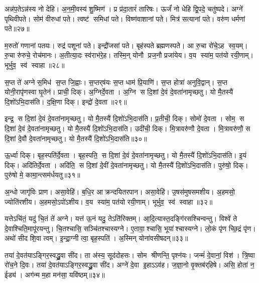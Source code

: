    अन्न॑प॒तेऽन्न॑स्य नो देहि।
   अ॒न॒मी॒वस्य॑ शु॒ष्मिण॑।
   प्र प्र॑दा॒तारं॑ तारिषः।
   ऊर्जं॑ नो धेहि द्वि॒पदे॒ चतु॑ष्पदे।
   अग्ने॑ पृथिवीपते।
   सोम॑ वीरुधां पते।
   त्वष्ट॑ समिधां पते।
   विष्ण॑वाशानां पते।
   मित्र॑ सत्यानां पते।
   वरु॑ण धर्मणां पते॥२७॥

   म॒रुतो॑  गणानां पतयः।
   रुद्र॑ पशूनां पते।
   इन्द्रौ॑जसां पते।
   बृह॑स्पते ब्रह्मणस्पते।
   आ रु॒चा रो॑चे॒ऽह स्व॒यम्।
   रु॒चा रु॑रुचे॒ रोच॑मानः।
   अ॒तीत्या॒दः स्व॑राभ॑रे॒ह।
   तस्मि॒न् योनौ प्रज॒नौ प्रजा॑येय।
   व॒य स्या॑म॒ पत॑यो रयी॒णाम्।
   भूर्भुव॒ स्व॑ स्वाहा॥२८॥
  \anuvakamend
  
    स॒प्त ते॑ अग्ने स॒मिध॑ स॒प्त जि॒ह्वाः।
   स॒प्तर्{‌}ष॑यः स॒प्त धाम॑ प्रि॒याणि॑।
   स॒प्त होत्रा॑ अनुवि॒द्वान्।
   स॒प्त योनी॒रापृ॑णस्वा घृ॒तेन॑।
   प्राची॒ दिक्।
   अ॒ग्निर्दे॒वता।
   अ॒ग्नि स दि॒शां दे॒वं दे॒वता॑नामृच्छतु।
   यो मै॒तस्यै॑ दि॒शो॑ऽभि॒दास॑ति।
   द॒क्षि॒णा दिक्।
   इन्द्रो॑ दे॒वता॥२९॥

   इन्द्र॒ स दि॒शां दे॒वं दे॒वता॑नामृच्छतु।
   यो मै॒तस्यै॑ दि॒शो॑ऽभि॒दास॑ति।
   प्र॒तीची॒ दिक्।
   सोमो॑ दे॒वता।
   सोम॒ स दि॒शां दे॒वं दे॒वता॑नामृच्छतु।
   यो मै॒तस्यै॑ दि॒शो॑ऽभि॒दास॑ति।
   उदी॑ची॒ दिक्।
   मि॒त्रावरु॑णौ दे॒वता।
   मि॒त्रावरु॑णौ॒ स दि॒शां दे॒वौ दे॒वता॑नामृच्छतु।
   यो मै॒तस्यै॑ दि॒शो॑ऽभि॒दास॑ति॥३०॥

   ऊ॒र्ध्वा दिक्।
   बृह॒स्पति॑र्दे॒वता।
   बृह॒स्पति॒ स दि॒शां दे॒वं दे॒वता॑नामृच्छतु।
   यो मै॒तस्यै॑ दि॒शो॑ऽभि॒दास॑ति।
   इ॒यं दिक्।
   अदि॑तिर्दे॒वता।
   अदि॑ति॒ स दि॒शां दे॒वीं दे॒वता॑नामृच्छतु।
   यो मै॒तस्यै॑ दि॒शो॑ऽभि॒दास॑ति।
   पुरु॑षो॒ दिक्।
   पुरु॑षो मे॒ कामा॒न्त्सम॑र्धयतु॥३१॥
   
   अ॒न्धो जागृ॑विः प्राण।
   असा॒वेहि॑।
   ब॒धि॒र आक्रन्दयितरपान।
   असा॒वेहि॑।
   उ॒षस॑मुषसमशीय।
   अ॒हमसो॒ ज्योति॑रशीय।
   अ॒हमसो॒ऽपो॑ऽशीय।
   व॒य स्या॑म॒ पत॑यो रयी॒णाम्।
   भूर्भुव॒ स्व॑ स्वाहा॥३२॥
\anuvakamend
  
   यत्तेऽचि॑तं॒ यदु॑ चि॒तं ते॑ अग्ने।
   यत्त॑ ऊ॒नं यदु॒ तेऽति॑रिक्तम्।
   आ॒दि॒त्यास्त॒दङ्गि॑रसश्चिन्वन्तु।
   विश्वे॑ ते दे॒वाश्चिति॒मापू॑रयन्तु।
   चि॒तश्चासि॒ सञ्चि॑तश्चास्यग्ने।
   ए॒तावा॒श्चासि॒ भूया॑श्चास्यग्ने।
   लो॒कं पृ॑ण च्छि॒द्रं पृ॑ण।
   अथो॑ सीद शि॒वा त्वम्।
   इ॒न्द्रा॒ग्नी त्वा॒ बृह॒स्पति॑।
   अ॒स्मिन् योना॑वसीषदन्॥३३॥

   तया॑ दे॒वत॑याऽङ्गिर॒स्वद्ध्रु॒वा सी॑द।
   ता अ॑स्य॒ सूद॑दोहसः।
   सोम श्रीणन्ति॒ पृश्न॑यः।
   जन्मं॑ दे॒वानां॒ विश॑।
   त्रि॒ष्वा रो॑च॒ने दि॒वः।
   तया॑ दे॒वत॑याऽङ्गिर॒स्वद्ध्रु॒वा सी॑द।
   अग्ने॑ दे॒वा इ॒हाऽऽव॑ह।
   ज॒ज्ञा॒नो वृ॒क्तब॑र्{‌}हिषे।
   असि॒ होता॑ न॒ ईड्य॑।
   अग॑न्म म॒हा मन॑सा॒ यवि॑ष्ठम्॥३४॥

